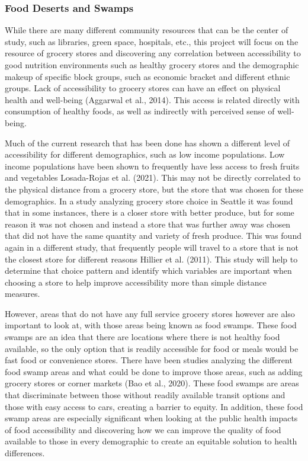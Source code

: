 \documentclass[
  letterpaper,
  authoryear,
  review,
  3p]{elsarticle}
\begin{document}
\hypertarget{food-deserts-and-swamps}{%
\subsubsection{Food Deserts and Swamps}\label{food-deserts-and-swamps}}

While there are many different community resources that can be the
center of study, such as libraries, green space, hospitals, etc., this
project will focus on the resource of grocery stores and discovering any
correlation between accessibility to good nutrition environments such as
healthy grocery stores and the demographic makeup of specific block
groups, such as economic bracket and different ethnic groups. Lack of
accessibility to grocery stores can have an effect on physical health
and well-being (Aggarwal et al., 2014). This access is related directly
with consumption of healthy foods, as well as indirectly with perceived
sense of well-being.

Much of the current research that has been done has shown a different
level of accessibility for different demographics, such as low income
populations. Low income populations have been shown to frequently have
less access to fresh fruits and vegetables Losada-Rojas et al. (2021).
This may not be directly correlated to the physical distance from a
grocery store, but the store that was chosen for these demographics. In
a study analyzing grocery store choice in Seattle it was found that in
some instances, there is a closer store with better produce, but for
some reason it was not chosen and instead a store that was further away
was chosen that did not have the same quantity and variety of fresh
produce. This was found again in a different study, that frequently
people will travel to a store that is not the closest store for
different reasons Hillier et al. (2011). This study will help to
determine that choice pattern and identify which variables are important
when choosing a store to help improve accessibility more than simple
distance measures.

However, areas that do not have any full service grocery stores however
are also important to look at, with those areas being known as food
swamps. These food swamps are an idea that there are locations where
there is not healthy food available, so the only option that is readily
accessible for food or meals would be fast food or convenience stores.
There have been studies analyzing the different food swamp areas and
what could be done to improve those areas, such as adding grocery stores
or corner markets (Bao et al., 2020). These food swamps are areas that
discriminate between those without readily available transit options and
those with easy access to cars, creating a barrier to equity. In
addition, these food swamp areas are especially significant when looking
at the public health impacts of food accessibility and discovering how
we can improve the quality of food available to those in every
demographic to create an equitable solution to health differences.
\end{document}
